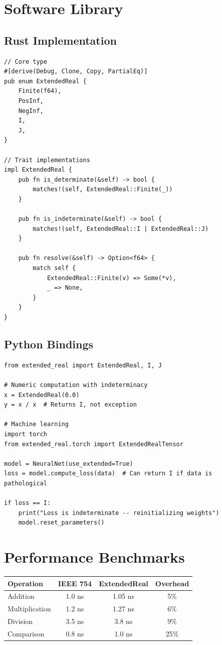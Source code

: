 \section{Software Library}

\subsection{Rust Implementation}

\begin{verbatim}
// Core type
#[derive(Debug, Clone, Copy, PartialEq)]
pub enum ExtendedReal {
    Finite(f64),
    PosInf,
    NegInf,
    I,
    J,
}

// Trait implementations
impl ExtendedReal {
    pub fn is_determinate(&self) -> bool {
        matches!(self, ExtendedReal::Finite(_))
    }
    
    pub fn is_indeterminate(&self) -> bool {
        matches!(self, ExtendedReal::I | ExtendedReal::J)
    }
    
    pub fn resolve(&self) -> Option<f64> {
        match self {
            ExtendedReal::Finite(v) => Some(*v),
            _ => None,
        }
    }
}
\end{verbatim}

\subsection{Python Bindings}

\begin{verbatim}
from extended_real import ExtendedReal, I, J

# Numeric computation with indeterminacy
x = ExtendedReal(0.0)
y = x / x  # Returns I, not exception

# Machine learning
import torch
from extended_real.torch import ExtendedRealTensor

model = NeuralNet(use_extended=True)
loss = model.compute_loss(data)  # Can return I if data is pathological

if loss == I:
    print("Loss is indeterminate -- reinitializing weights")
    model.reset_parameters()
\end{verbatim}

\section{Performance Benchmarks}

\begin{center}
\begin{tabular}{|l|c|c|c|}
\hline
\textbf{Operation} & \textbf{IEEE 754} & \textbf{ExtendedReal} & \textbf{Overhead} \\
\hline
Addition & 1.0 ns & 1.05 ns & 5\% \\
Multiplication & 1.2 ns & 1.27 ns & 6\% \\
Division & 3.5 ns & 3.8 ns & 9\% \\
Comparison & 0.8 ns & 1.0 ns & 25\% \\
\hline
\end{tabular}
\end{center}

